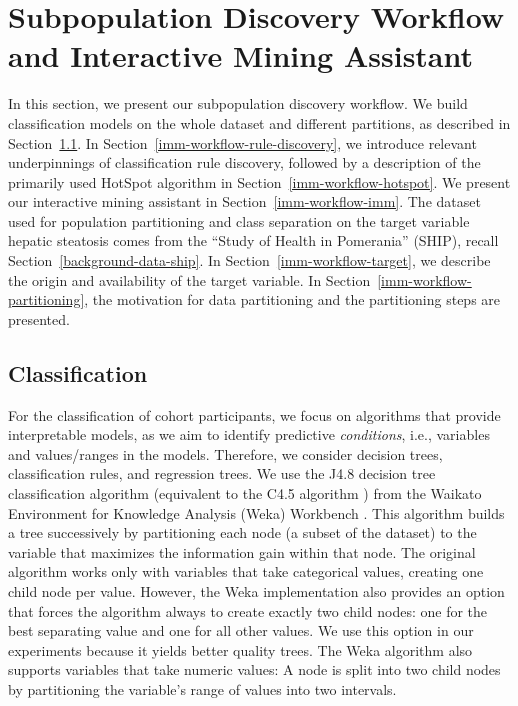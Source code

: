 \documentclass[
  oneside]{book}
\begin{document}
\hypertarget{imm-workflow}{%
\section{Subpopulation Discovery Workflow and Interactive Mining Assistant}\label{imm-workflow}}

In this section, we present our subpopulation discovery workflow.
We build classification models on the whole dataset and different partitions, as described in Section~\ref{imm-workflow-classification}.
In Section~\ref{imm-workflow-rule-discovery}, we introduce relevant underpinnings of classification rule discovery, followed by a description of the primarily used HotSpot \autocite{hotspot2012} algorithm in Section~\ref{imm-workflow-hotspot}.
We present our interactive mining assistant in Section~\ref{imm-workflow-imm}.
The dataset used for population partitioning and class separation on the target variable hepatic steatosis comes from the ``Study of Health in Pomerania'' (SHIP), recall Section~\ref{background-data-ship}.
In Section~\ref{imm-workflow-target}, we describe the origin and availability of the target variable.
In Section~\ref{imm-workflow-partitioning}, the motivation for data partitioning and the partitioning steps are presented.

\hypertarget{imm-workflow-classification}{%
\subsection{Classification}\label{imm-workflow-classification}}

For the classification of cohort participants, we focus on algorithms that provide interpretable models, as we aim to identify predictive \emph{conditions}, i.e., variables and values/ranges in the models.
Therefore, we consider decision trees, classification rules, and regression trees.
We use the J4.8 decision tree classification algorithm (equivalent to the C4.5 algorithm \autocite{Q92}) from the Waikato Environment for Knowledge Analysis (Weka) Workbench \autocite{FrankEtAl:Weka2016}.
This algorithm builds a tree successively by partitioning each node (a subset of the dataset) to the variable that maximizes the information gain within that node.
The original algorithm works only with variables that take categorical values, creating one child node per value.
However, the Weka implementation also provides an option that forces the algorithm always to create exactly two child nodes: one for the best separating value and one for all other values.
We use this option in our experiments because it yields better quality trees.
The Weka algorithm also supports variables that take numeric values:
A node is split into two child nodes by partitioning the variable's range of values into two intervals.
\end{document}

